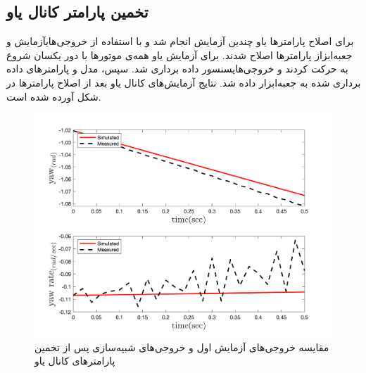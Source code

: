 \subsection{تخمین پارامتر کانال یاو}
برای اصلاح پارامترها یاو چندین آزمایش انجام شد و با استفاده از خروجی‌هایآزمایش و جعبه‌ابزاز
پارامترها اصلاح شدند.
برای آزمایش یاو همه‌ی موتورها با دور یکسان شروع به حرکت کردند و خروجی‌هایسنسور داده برداری شد. سپس، مدل و پارامترهای داده برداری شده به جعبه‌ابزار
داده شد. نتایج آزمایش‌های کانال یاو بعد از اصلاح پارامترها در شکل
آورده شده است.

\begin{figure}[H]
	\includegraphics[width=12cm]{../../Figures/RCP/yaw_parameter_estimation/RCP_yaw_S1.png}
	\centering
	\caption{مقايسه خروجی‌های آزمايش اول و خروجی‌های شبیه‌سازی پس از تخمین پارامترهای کانال یاو}
	\label{yaw_ps1}
\end{figure}
